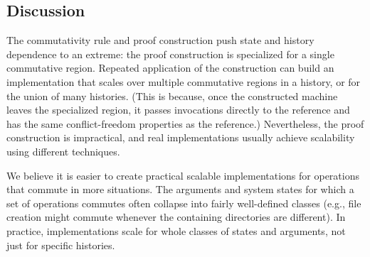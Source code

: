 \begin{comment}
\caption{\textbf{(a)} A serial, single-threaded history. Each invocation (filled
  circle) is immediately followed by its response (open circle).
%
  \textbf{(b)} A three-thread history. Colors indicate different threads.
%
  \textbf{(c)} The thread-restricted subhistories of (b). Each is
  serial.
%
  \textbf{(d)} A three-thread history with a commutative region. The
  commutative region is highlighted.
%
  \textbf{(e)} Three interleavings of the commutative region.
%
  \protect\XXX[E][This figure is currently unreferenced, leaving it in case
  others think it useful.]~
}
\end{figure*}
\end{comment}

\subsection{Discussion}

The commutativity rule and proof construction push state and
history dependence to an extreme: the proof construction is specialized
for a single commutative region.
%
Repeated application of the construction can build an
implementation that scales over multiple commutative regions in a
history, or for the union of many histories.
%
(This is because, once the constructed machine leaves the specialized
region, it passes invocations directly to the reference and has
the same conflict-freedom properties as the reference.)
%
Nevertheless, the proof construction is impractical, and real
implementations usually achieve scalability using different techniques.

We believe it is easier to create practical scalable implementations for
operations that commute in more situations.
%
The arguments and system states for which a set of operations
commutes often collapse into
fairly well-defined classes (e.g., file creation might
commute whenever the containing directories are different).
%
In practice, implementations scale for whole classes of states and
arguments, not just for specific histories.

